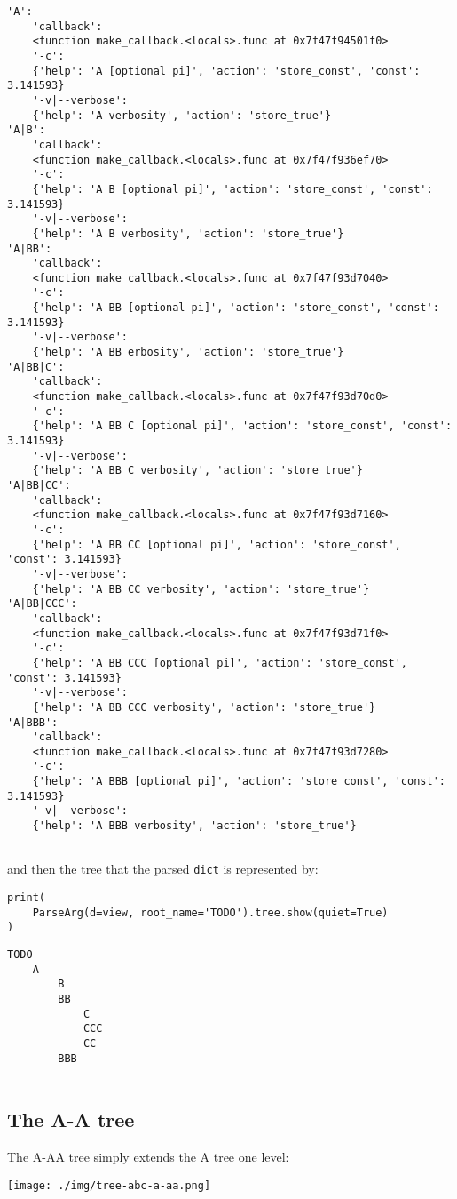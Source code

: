 \documentclass[10pt]{amsart}
\numberwithin{equation}{section}
\begin{document}
\begin{verbatim}
'A':
    'callback':
    <function make_callback.<locals>.func at 0x7f47f94501f0>
    '-c':
    {'help': 'A [optional pi]', 'action': 'store_const', 'const': 3.141593}
    '-v|--verbose':
    {'help': 'A verbosity', 'action': 'store_true'}
'A|B':
    'callback':
    <function make_callback.<locals>.func at 0x7f47f936ef70>
    '-c':
    {'help': 'A B [optional pi]', 'action': 'store_const', 'const': 3.141593}
    '-v|--verbose':
    {'help': 'A B verbosity', 'action': 'store_true'}
'A|BB':
    'callback':
    <function make_callback.<locals>.func at 0x7f47f93d7040>
    '-c':
    {'help': 'A BB [optional pi]', 'action': 'store_const', 'const': 3.141593}
    '-v|--verbose':
    {'help': 'A BB erbosity', 'action': 'store_true'}
'A|BB|C':
    'callback':
    <function make_callback.<locals>.func at 0x7f47f93d70d0>
    '-c':
    {'help': 'A BB C [optional pi]', 'action': 'store_const', 'const': 3.141593}
    '-v|--verbose':
    {'help': 'A BB C verbosity', 'action': 'store_true'}
'A|BB|CC':
    'callback':
    <function make_callback.<locals>.func at 0x7f47f93d7160>
    '-c':
    {'help': 'A BB CC [optional pi]', 'action': 'store_const', 'const': 3.141593}
    '-v|--verbose':
    {'help': 'A BB CC verbosity', 'action': 'store_true'}
'A|BB|CCC':
    'callback':
    <function make_callback.<locals>.func at 0x7f47f93d71f0>
    '-c':
    {'help': 'A BB CCC [optional pi]', 'action': 'store_const', 'const': 3.141593}
    '-v|--verbose':
    {'help': 'A BB CCC verbosity', 'action': 'store_true'}
'A|BBB':
    'callback':
    <function make_callback.<locals>.func at 0x7f47f93d7280>
    '-c':
    {'help': 'A BBB [optional pi]', 'action': 'store_const', 'const': 3.141593}
    '-v|--verbose':
    {'help': 'A BBB verbosity', 'action': 'store_true'}


\end{verbatim}
and then the tree that the parsed \texttt{dict} is represented by:
\begin{verbatim}
print(
    ParseArg(d=view, root_name='TODO').tree.show(quiet=True)
)
\end{verbatim}

\begin{verbatim}
TODO
    A
        B
        BB
            C
            CCC
            CC
        BBB


\end{verbatim}

\subsection{The A-A tree}
\label{sec:org79ff402}
The A-AA tree simply extends the A tree one level:
\begin{center}
\texttt{[image: ./img/tree-abc-a-aa.png]}
\end{center}
\end{document}
